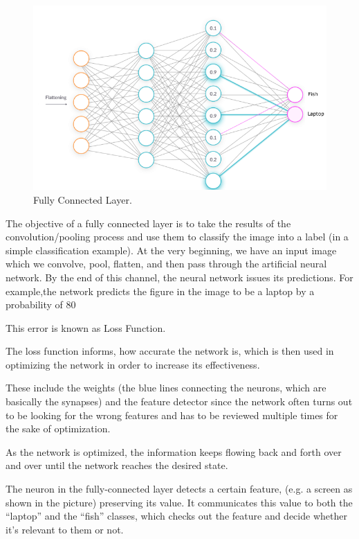 \documentclass[a4paper,13pt,twoside]{book}
\begin{document}
\begin{figure}[h!]
  \includegraphics[width=\linewidth]{Images/fullyconnectedlayer(23).png}
  \caption{Fully Connected Layer.}
  \label{fig:fully connected layer}
\end{figure}

The objective of a fully connected layer is to take the results of the convolution/pooling process and use them to classify the image into a label (in a simple classification example).
At the very beginning, we have an input image which we convolve, pool, flatten, and then pass through the artificial neural network.
By the end of this channel, the neural network issues its predictions. For example,the network predicts the figure in the image to be a laptop by a probability of 80%

This error is known as Loss Function.

The loss function informs, how accurate the network is, which is then used in optimizing the network in order to increase its effectiveness.

These include the weights (the blue lines connecting the neurons, which are basically the synapses) and the feature detector since the network often turns out to be looking for the wrong features and has to be reviewed multiple times for the sake of optimization.

As the network is optimized, the information keeps flowing back and forth over and over until the network reaches the desired state.

The neuron in the fully-connected layer detects a certain feature, (e.g. a screen as shown in the picture) preserving its value.
It communicates this value to both the “laptop” and the “fish” classes, which checks out the feature and decide whether it's relevant to them or not.
\end{document}
